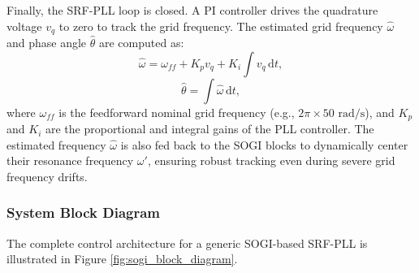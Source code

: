 Finally, the SRF-PLL loop is closed. A PI controller drives the quadrature voltage \(v_q\) to zero to track the grid frequency. The estimated grid frequency \(\hat{\omega}\) and phase angle \(\hat{\theta}\) are computed as:
\begin{equation}
	\label{eq:pll-pi-control}
	\hat{\omega} = \omega_{ff} + K_p v_q + K_i \int v_q \, \mathrm{d}t,
\end{equation}
\begin{equation}
	\label{eq:pll-theta}
	\hat{\theta} = \int \hat{\omega} \, \mathrm{d}t,
\end{equation}
where \(\omega_{ff}\) is the feedforward nominal grid frequency (e.g., \(2\pi \times 50\text{ rad/s}\)), and \(K_p\) and \(K_i\) are the proportional and integral gains of the PLL controller. The estimated frequency \(\hat{\omega}\) is also fed back to the SOGI blocks to dynamically center their resonance frequency \(\omega'\), ensuring robust tracking even during severe grid frequency drifts.

\vspace{1em}

\subsubsection{System Block Diagram}
The complete control architecture for a generic SOGI-based SRF-PLL is illustrated in Figure \ref{fig:sogi_block_diagram}.

